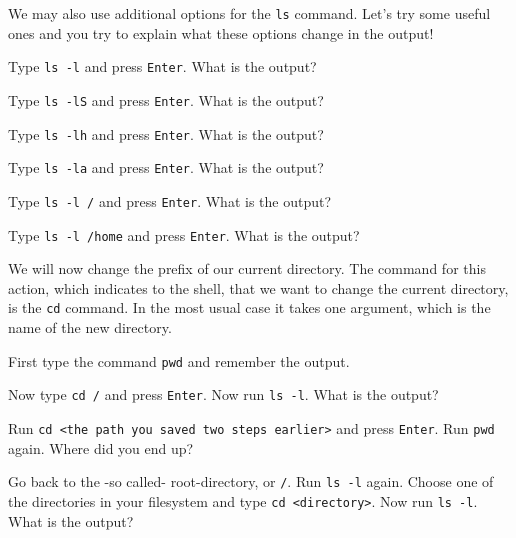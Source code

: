 \begin{challenge}
    \begin{task}
        We may also use additional options for the \texttt{ls} command.
        Let's try some useful ones and you try to explain what these options change in the output!
        \begin{questions}
            \item Type \texttt{ls -l} and press \texttt{Enter}. What is the output?
            \item Type \texttt{ls -lS} and press \texttt{Enter}. What is the output?
            \item Type \texttt{ls -lh} and press \texttt{Enter}. What is the output?
            \item Type \texttt{ls -la} and press \texttt{Enter}. What is the output?
            \item Type \texttt{ls -l /} and press \texttt{Enter}. What is the output?
            \item Type \texttt{ls -l /home} and press \texttt{Enter}. What is the output?
        \end{questions}
    \end{task}

    \begin{task}
    We will now change the prefix of our current directory.
    The command for this action, which indicates to the shell, that we want to change the current directory, is the \texttt{cd} command.
    In the most usual case it takes one argument, which is the name of the new directory.
        \begin{questions}
            \item First type the command \texttt{pwd} and remember the output. 
            \item Now type \texttt{cd /} and press \texttt{Enter}. Now run \texttt{ls -l}. What is the output?
            \item Run \texttt{cd <the path you saved two steps earlier>} and press \texttt{Enter}. Run \texttt{pwd} again. Where did you end up?
            \item Go back to the -so called- root-directory, or \texttt{/}. Run \texttt{ls -l} again. Choose one of the directories in your filesystem and type \texttt{cd <directory>}. Now run \texttt{ls -l}. What is the output?
        \end{questions}
    \end{task}


\end{challenge}
